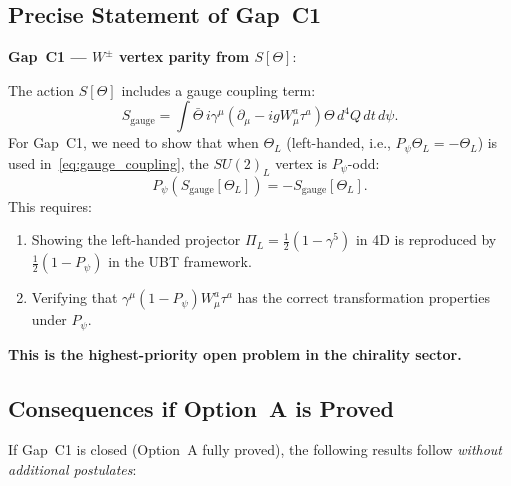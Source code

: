 \documentclass[12pt,a4paper]{article}
\theoremstyle{definition}
\theoremstyle{remark}
\begin{document}
\subsection{Precise Statement of Gap~C1}
\label{subsec:gap_c1}

\begin{gapbox}
\textbf{Gap~C1 --- $W^\pm$ vertex parity from $S[\Theta]$}:

The action $S[\Theta]$ includes a gauge coupling term:
\begin{equation}
  S_{\mathrm{gauge}} = \int \bar\Theta\, i\gamma^\mu(\partial_\mu - igW_\mu^a\tau^a)\Theta\,
    d^4Q\, dt\, d\psi.
\label{eq:gauge_coupling}
\end{equation}
For Gap~C1, we need to show that when $\Theta_L$ (left-handed, i.e.,
$P_\psi\Theta_L = -\Theta_L$) is used in~\eqref{eq:gauge_coupling}, the
$SU(2)_L$ vertex is $P_\psi$-odd:
\begin{equation}
  P_\psi(S_{\mathrm{gauge}}[\Theta_L]) = -S_{\mathrm{gauge}}[\Theta_L].
\label{eq:gap_c1}
\end{equation}
This requires:
\begin{enumerate}
  \item[(a)] Showing the left-handed projector $\Pi_L = \frac{1}{2}(1-\gamma^5)$
    in 4D is reproduced by $\frac{1}{2}(1 - P_\psi)$ in the UBT framework.
  \item[(b)] Verifying that $\gamma^\mu(1-P_\psi)W_\mu^a\tau^a$ has the
    correct transformation properties under $P_\psi$.
\end{enumerate}
\textbf{This is the highest-priority open problem in the chirality sector.}
\end{gapbox}

\subsection{Consequences if Option~A is Proved}
\label{subsec:consequences}

If Gap~C1 is closed (Option~A fully proved), the following results follow
\emph{without additional postulates}:
\end{document}
